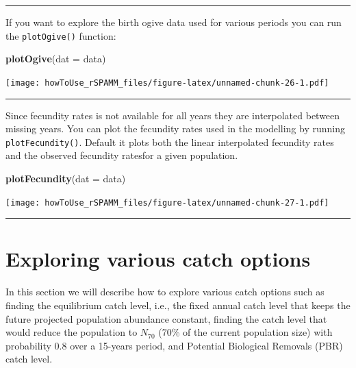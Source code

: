 \documentclass[
]{article}
\newenvironment{Shaded}{\begin{snugshade}}{\end{snugshade}}
\newcommand{\DataTypeTok}[1]{\textcolor[rgb]{0.13,0.29,0.53}{#1}}
\newcommand{\KeywordTok}[1]{\textcolor[rgb]{0.13,0.29,0.53}{\textbf{#1}}}
\newcommand{\NormalTok}[1]{#1}
\begin{document}
\begin{center}\rule{0.5\linewidth}{0.5pt}\end{center}

If you want to explore the birth ogive data used for various periods you
can run the \texttt{plotOgive()} function:

\begin{Shaded}
\begin{Highlighting}[]
\KeywordTok{plotOgive}\NormalTok{(}\DataTypeTok{dat =}\NormalTok{ data)}
\end{Highlighting}
\end{Shaded}

\texttt{[image: howToUse\_rSPAMM\_files/figure-latex/unnamed-chunk-26-1.pdf]}

\begin{center}\rule{0.5\linewidth}{0.5pt}\end{center}

Since fecundity rates is not available for all years they are
interpolated between missing years. You can plot the fecundity rates
used in the modelling by running \texttt{plotFecundity()}. Default it
plots both the linear interpolated fecundity rates and the observed
fecundity ratesfor a given population.

\begin{Shaded}
\begin{Highlighting}[]
\KeywordTok{plotFecundity}\NormalTok{(}\DataTypeTok{dat =}\NormalTok{ data)}
\end{Highlighting}
\end{Shaded}

\texttt{[image: howToUse\_rSPAMM\_files/figure-latex/unnamed-chunk-27-1.pdf]}

\begin{center}\rule{0.5\linewidth}{0.5pt}\end{center}

\hypertarget{exploring-various-catch-options}{%
\section{Exploring various catch
options}\label{exploring-various-catch-options}}

In this section we will describe how to explore various catch options
such as finding the equilibrium catch level, i.e., the fixed annual
catch level that keeps the future projected population abundance
constant, finding the catch level that would reduce the population to
\(N_{70}\) (70\% of the current population size) with probability 0.8
over a 15-years period, and Potential Biological Removals (PBR) catch
level.
\end{document}
